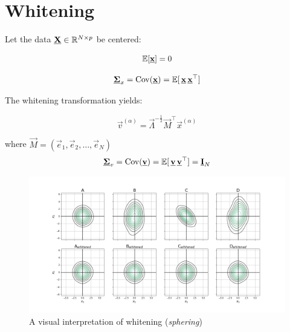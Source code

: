 \newpage
\section{Whitening}

\begin{frame}


Let the data $\underline{\mathbf{X}} \in \mathbb{R}^{N \times p}$ be centered:

\begin{equation}
\label{eq:centered}
\mathbb{E} \lbrack \underline{\mathbf{x}} \rbrack = 0 
\end{equation}


\begin{equation}
\label{eq:cov}
\underline{\mathbf{\Sigma}}_x = \mathrm{Cov}(\underline{\mathbf{x}}) = \mathbb{E} \lbrack \, \underline{\mathbf{x}} \, \underline{\mathbf{x}}^\top \rbrack 
\end{equation}

The whitening transformation yields:

\begin{equation}
\label{eq:whitening}
\vec v^{(\alpha)} = \vec \Lambda^{-\frac{1}{2}} \vec M^\top \vec x^{(\alpha)}
\end{equation}

where $\vec M = (\vec e_1, \vec e_2, \ldots,\vec e_N)$
\begin{equation}
\label{eq:covw}
\underline{\mathbf{\Sigma}}_v = \mathrm{Cov}(\underline{\mathbf{v}}) = \mathbb{E} \lbrack \, \underline{\mathbf{v}} \, \underline{\mathbf{v}}^\top \rbrack = \underline{\mathbf{I}}_N
\end{equation}

\end{frame}

\begin{frame}
\begin{figure}[ht]
\label{fig:sphering}
\includegraphics[width=12cm]{img/cov.png}
\caption{A visual interpretation of whitening (\emph{sphering})}
\end{figure}

\end{frame}
\newpage
